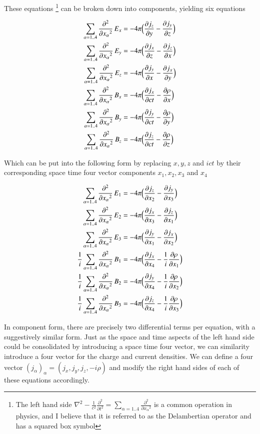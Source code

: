 \documentclass{article}      %
\newcommand{\delsquared}[0]{\nabla^2}
\newcommand{\delambert}[1]{\sum_{\alpha = 1 .. 4}{\Dsq{x_\alpha}{#1}}}
\newcommand{\D}[2] {\frac {\partial #2} {\partial #1}}
\newcommand{\Dsq}[2] {\frac {\partial^2 #2} {\partial {#1}^2}}
\begin{document}
These equations 
\footnote{
The left hand side 
$
\delsquared - \frac{1}{c^2}\Dsq{t}{}
= 
\delambert{}
$
is a common operation in physics, and I believe that 
it is referred to as the Delambertian operator and has a squared box symbol
}
can be broken down 
into components, yielding six equations

\begin{align*}
\delambert{} \,E_x &= - 4\pi \Bigl(\D{y}{j_z} - \D{z}{j_y} \Bigr) \\
\delambert{} \,E_y &= - 4\pi \Bigl(\D{z}{j_x} - \D{x}{j_z} \Bigr) \\
\delambert{} \,E_z &= - 4\pi \Bigl(\D{x}{j_y} - \D{y}{j_x} \Bigr) \\
\delambert{} \,B_x &= - 4\pi \Bigl(\D{ct}{j_x} - \D{x}{\rho} \Bigr)\\
\delambert{} \,B_y &= - 4\pi \Bigl(\D{ct}{j_y} - \D{y}{\rho} \Bigr)\\
\delambert{} \,B_z &= - 4\pi \Bigl(\D{ct}{j_z} - \D{z}{\rho} \Bigr)
\end{align*}

Which can be put into the following form by replacing $x, y, z$ and $ict$ by their 
corresponding space time four vector components $x_1, x_2, x_3$ and $x_4$

\begin{align*}
            \delambert{} \,E_1 &= - 4\pi \Bigl( \D{x_2}{j_z} -             \D{x_3}{j_y} \Bigr) \\
            \delambert{} \,E_2 &= - 4\pi \Bigl( \D{x_3}{j_x} -             \D{x_1}{j_z} \Bigr) \\
            \delambert{} \,E_3 &= - 4\pi \Bigl( \D{x_1}{j_y} -             \D{x_2}{j_x} \Bigr) \\
\frac{1}{i} \delambert{} \,B_1 &= - 4\pi \Bigl( \D{x_4}{j_x} - \frac{1}{i} \D{x_1}{\rho} \Bigr)\\
\frac{1}{i} \delambert{} \,B_2 &= - 4\pi \Bigl( \D{x_4}{j_y} - \frac{1}{i} \D{x_2}{\rho} \Bigr)\\
\frac{1}{i} \delambert{} \,B_3 &= - 4\pi \Bigl( \D{x_4}{j_z} - \frac{1}{i} \D{x_3}{\rho} \Bigr)
\end{align*}

In component form,
there are precisely two differential terms per equation, with a suggestively 
similar form.
Just as the space and time aspects of the left hand side could be consolidated
by introducing a space time four vector, we can similarity introduce a four 
vector for the 
charge and current densities.
We can define a four vector $(j_\alpha)_\alpha = 
(j_x, j_y, j_z, -i \rho)$ and modify the right hand sides of each of these equations 
accordingly.
\end{document}
